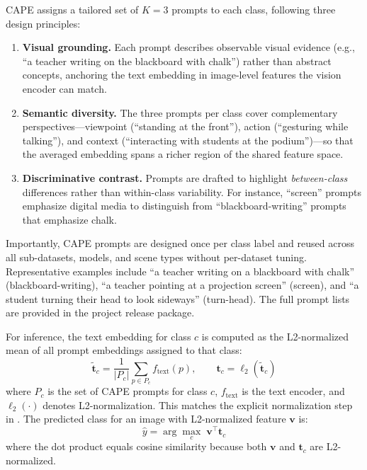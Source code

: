\documentclass[electronics,article,submit,pdftex,moreauthors]{Definitions/mdpi}
\begin{document}
CAPE assigns a tailored set of $K=3$ prompts to each class, following three design principles:
\begin{enumerate}
    \item \textbf{Visual grounding.} Each prompt describes observable visual evidence (e.g., ``a teacher writing on the blackboard with chalk'') rather than abstract concepts, anchoring the text embedding in image-level features the vision encoder can match.
    \item \textbf{Semantic diversity.} The three prompts per class cover complementary perspectives---viewpoint (``standing at the front''), action (``gesturing while talking''), and context (``interacting with students at the podium'')---so that the averaged embedding spans a richer region of the shared feature space.
    \item \textbf{Discriminative contrast.} Prompts are drafted to highlight \emph{between-class} differences rather than within-class variability. For instance, ``screen'' prompts emphasize digital media to distinguish from ``blackboard-writing'' prompts that emphasize chalk.
\end{enumerate}
Importantly, CAPE prompts are designed once per class label and reused across all sub-datasets, models, and scene types without per-dataset tuning.
Representative examples include ``a teacher writing on a blackboard with chalk'' (blackboard-writing), ``a teacher pointing at a projection screen'' (screen), and ``a student turning their head to look sideways'' (turn-head). The full prompt lists are provided in the project release package.

For inference, the text embedding for class $c$ is computed as the L2-normalized mean of all prompt embeddings assigned to that class:
\begin{equation}
\tilde{\mathbf{t}}_c = \frac{1}{|P_c|} \sum_{p \in P_c} f_{\text{text}}(p), \qquad \mathbf{t}_c = \ell_2(\tilde{\mathbf{t}}_c)
\end{equation}
where $P_c$ is the set of CAPE prompts for class $c$, $f_{\text{text}}$ is the text encoder, and $\ell_2(\cdot)$ denotes L2-normalization. This matches the explicit normalization step in .
The predicted class for an image with L2-normalized feature $\mathbf{v}$ is:
\begin{equation}
\hat{y} = \arg\max_{c} \; \mathbf{v}^{\!\top} \mathbf{t}_c
\end{equation}
where the dot product equals cosine similarity because both $\mathbf{v}$ and $\mathbf{t}_c$ are L2-normalized.
\end{document}
